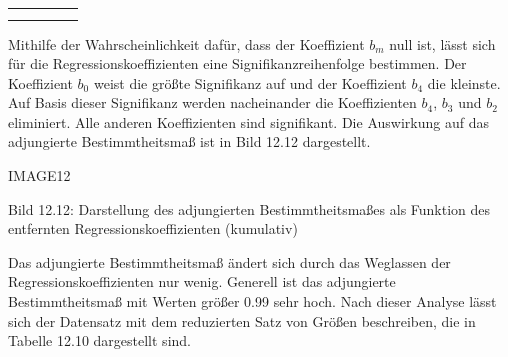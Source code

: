 \begin{table}[H]
{\begin{tabular}{| c | c | c | c | c |}
\parbox[c][0.3in][c]{1.18in}{} &
\parbox[c][0.3in][c]{1.18in}{} &
\parbox[c][0.3in][c]{1.18in}{} &
\parbox[c][0.3in][c]{1.18in}{} &
\parbox[c][0.3in][c]{1.18in}{} \\ \hline

\parbox[c][0.3in][c]{1.18in}{} &
\parbox[c][0.3in][c]{1.18in}{} &
\parbox[c][0.3in][c]{1.18in}{} &
\parbox[c][0.3in][c]{1.18in}{} &
\parbox[c][0.3in][c]{1.18in}{} \\ \hline

\parbox[c][0.3in][c]{1.18in}{} &
\parbox[c][0.3in][c]{1.18in}{} &
\parbox[c][0.3in][c]{1.18in}{} &
\parbox[c][0.3in][c]{1.18in}{} &
\parbox[c][0.3in][c]{1.18in}{} \\ \hline

\end{tabular}%
}
\label{tab:thirteennine}
\end{table}

\noindent Mithilfe der Wahrscheinlichkeit daf\"{u}r, dass der Koeffizient $b_{m}$ null ist, l\"{a}sst sich f\"{u}r die Regressionskoeffizienten eine Signifikanzreihenfolge bestimmen. Der Koeffizient $b_{0}$ weist die gr\"{o}{\ss}te Signifikanz auf und der Koeffizient $b_{4}$ die kleinste. Auf Basis dieser Signifikanz werden nacheinander die Koeffizienten $b_{4}$, $b_{3}$ und $b_{2}$ eliminiert. Alle anderen Koeffizienten sind signifikant. Die Auswirkung auf das adjungierte Bestimmtheitsma{\ss} ist in Bild 12.12 dargestellt. 

IMAGE12

\noindent Bild 12.12: Darstellung des adjungierten Bestimmtheitsma{\ss}es als Funktion des entfernten Regressionskoeffizienten (kumulativ)

\noindent Das adjungierte Bestimmtheitsma{\ss} \"{a}ndert sich durch das Weglassen der Regressionskoeffizienten nur wenig. Generell ist das adjungierte Bestimmtheitsma{\ss} mit Werten gr\"{o}{\ss}er 0.99 sehr hoch. Nach dieser Analyse l\"{a}sst sich der Datensatz mit dem reduzierten Satz von Gr\"{o}{\ss}en beschreiben, die in Tabelle 12.10 dargestellt sind.

